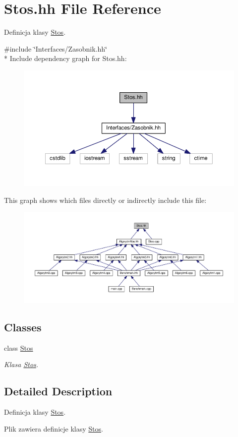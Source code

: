 \hypertarget{a00056}{}\section{Stos.\+hh File Reference}
\label{a00056}


Definicja klasy \hyperlink{a00018}{Stos}.  


{\ttfamily \#include \char`\"{}Interfaces/\+Zasobnik.\+hh\char`\"{}}\\*
Include dependency graph for Stos.\+hh\+:
\nopagebreak
\begin{figure}[H]
\begin{center}
\leavevmode
\includegraphics[width=350pt]{a00112}
\end{center}
\end{figure}
This graph shows which files directly or indirectly include this file\+:
\nopagebreak
\begin{figure}[H]
\begin{center}
\leavevmode
\includegraphics[width=350pt]{a00113}
\end{center}
\end{figure}
\subsection*{Classes}
\begin{DoxyCompactItemize}
\item 
class \hyperlink{a00018}{Stos}
\begin{DoxyCompactList}\small\item\em Klasa \hyperlink{a00018}{Stos}. \end{DoxyCompactList}\end{DoxyCompactItemize}


\subsection{Detailed Description}
Definicja klasy \hyperlink{a00018}{Stos}. 

Plik zawiera definicje klasy \hyperlink{a00018}{Stos}. 